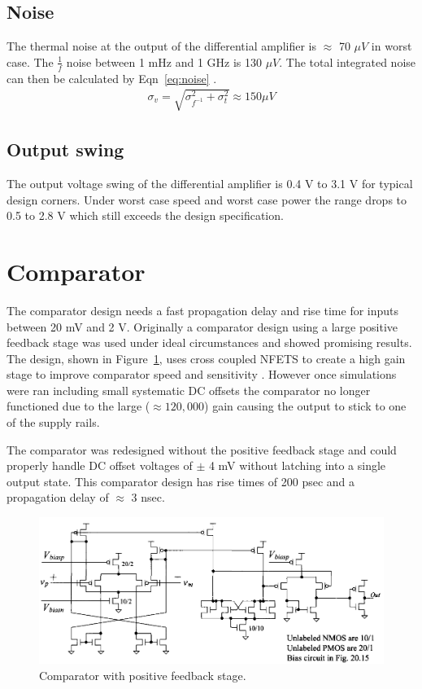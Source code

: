 \documentclass[12pt,oneside,final]{siuethesis}
\theoremstyle{definition}
\begin{document}
\subsection{Noise}
\par The thermal noise at the output of the differential amplifier is $\approx$ 70 $\mu V$ in worst case. The $\frac{1}{f}$ noise between 1 mHz and 1 GHz is 130 $\mu V$. The total integrated noise can then be calculated by Eqn~\ref{eq:noise} \cite{ALLEN-HOLBERG}.
\begin{align}
\sigma _{ v} = \sqrt{\sigma _{f^{-1}}^{2} + \sigma _{t}^{2}} \approx 150 \mu V
\label{eq:noise}
\end{align}
\subsection{Output swing}
\par The output voltage swing of the differential amplifier is 0.4 V to 3.1 V for typical design corners. Under worst case speed and worst case power the range drops to 0.5 to 2.8 V which still exceeds the design specification. 
\section{Comparator}
\par The comparator design needs a fast propagation delay and rise time for inputs between 20 mV and 2 V. Originally a comparator design using a large positive feedback stage was used under ideal circumstances and showed promising results. The design, shown in Figure~\ref{fig:feedback}, uses cross coupled NFETS to create a high gain stage to improve comparator speed and sensitivity \cite{BAKER}. However once simulations were ran including small systematic DC offsets the comparator no longer functioned due to the large ($\approx 120,000$) gain causing the output to stick to one of the supply rails. 
\par The comparator was redesigned without the positive feedback stage and could properly handle DC offset voltages of $\pm$ 4 mV without latching into a single output state. This comparator design has rise times of 200 psec and a propagation delay of $\approx$ 3 nsec.
\begin{figure}[htbp!]
\centering
\includegraphics[scale=.55,keepaspectratio=true]{images/old_comp.png}
\caption{Comparator with positive feedback stage.}
\label{fig:feedback}
\end{figure}
\end{document}
